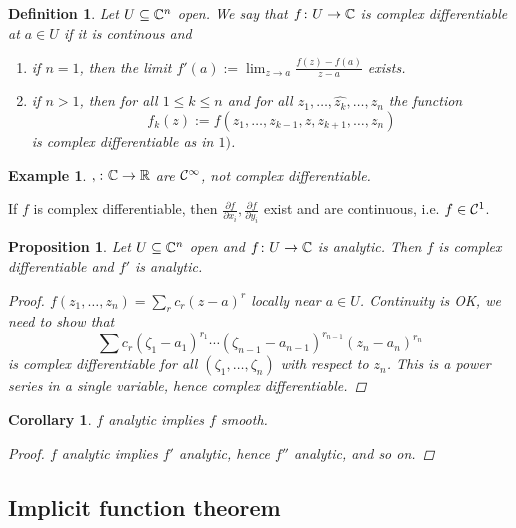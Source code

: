 \documentclass[A4paper, british, reqno]{amsart}
\theoremstyle{darkgreentheorem}
\newtheorem{prop}[thm]{Proposition}
\newtheorem{cor}[thm]{Corollary}
\theoremstyle{darkbluedefinition}
\newtheorem{defn}[thm]{Definition}
\theoremstyle{darkredexample}
\newtheorem{exa}[thm]{Example}
\theoremstyle{remark}
\let\Re\relax
\DeclareMathOperator{\Re}{Re}
\let\Im\relax
\DeclareMathOperator{\Im}{Im}
\newcommand{\1}{\mathbbm{1}}
\begin{document}
\begin{defn}
    Let $U\subseteq \mathbb{C}^{n}$ open.
    We say that $f\colon U\to \mathbb{C}$ is \textit{complex differentiable} at $a\in U$ if it is continous and
    \begin{enumerate}[label=\roman*)]
	\item if $n=1$, then the limit $f'(a):=\lim_{z\to a}\frac{f(z)-f(a)}{z-a}$ exists.
	\item if $n>1$, then for all $1\leqslant k\leqslant n$ and for all $z_{1},\ldots,\hat{z_{k}},\ldots,z_{n}$ the function
	    \[ f_{k}(z):=f(z_{1},\ldots,z_{k-1},z,z_{k+1},\ldots,z_{n})\]
	    is complex differentiable as in $1)$.
    \end{enumerate}
\end{defn}

\begin{exa}
    $\Re,\Im\colon \C\to \R$ are $\mathcal{C}^{\infty}$, not complex differentiable.
\end{exa}

If $f$ is complex differentiable, then $\frac{\partial f}{\partial x_{i}},\frac{\partial f}{\partial y_{i}}$ exist and are continuous, i.e. $f\in \mathcal{C}^{1}$.

\begin{prop}
    Let $U\subseteq \mathbb{C}^{n}$ open and $f\colon U\to \mathbb{C}$ is analytic.
    Then $f$ is complex differentiable and $f'$ is analytic.
    \begin{proof}
	$f(z_{1},\ldots,z_{n})=\sum_{r}c_{r}(z-a)^{r}$ locally near $a\in U$.
	Continuity is OK, we need to show that
	\[ \sum c_{r}(\zeta_{1}-a_{1})^{r_{1}}\cdots (\zeta_{n-1}-a_{n-1})^{r_{n-1}}(z_{n}-a_{n})^{r_{n}}\]
	is complex differentiable for all $(\zeta_{1},\ldots,\zeta_{n})$ with respect to $z_{n}$.
	This is a power series in a single variable, hence complex differentiable.
    \end{proof}
\end{prop}

\begin{cor}
    $f$ analytic implies $f$ smooth.
    \begin{proof}
	$f$ analytic implies $f'$ analytic, hence $f''$ analytic, and so on.
    \end{proof}
\end{cor}

\subsection{Implicit function theorem}
\end{document}

